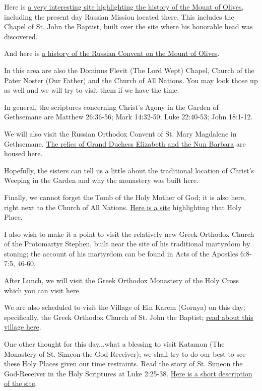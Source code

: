 \documentclass[letterpaper]{report}
\begin{document}
Here is 
\href{http://www.pravoslavie.ru/english/46854.htm}{
	a very interesting site highlighting the history of the Mount of Olives},
 including the present day Russian Mission located there.
 This includes the Chapel of St. John the Baptist,
 built over the site where his honorable head was discovered.

And here is \href{http://jerusalem-mission.org/convent_ascension.html}{
	a history of the Russian Convent on the Mount of Olives}.

In this area are also the Dominus Flevit (The Lord Wept) Chapel,
Church of the Pater Noster (Our Father) and the Church of All Nations.
You may look those up as well and we will try to visit them if we have the 
time.

In general, the scriptures concerning Christ's Agony in the Garden of 
Gethsemane are Matthew 26:36-56; Mark 14:32-50; Luke 22:40-53; John 18:1-12.

We will also visit the Russian Orthodox Convent of St. Mary Magdalene in
Gethsemane.
\href{http://www.pravoslavie.ru/english/63239.htm}{
The relics of Grand Duchess Elizabeth and the Nun Barbara} are housed here.

Hopefully, the sisters can tell us a little about the traditional location of 
Christ's Weeping in the Garden and why the monastery was built here.

Finally, we cannot forget the Tomb of the Holy Mother of God;
it is also here, right next to the Church of All Nations.
\href{https://orthodoxword.wordpress.com/2010/08/15/the-tomb-of-the-most-holy-virgin-jerusalem/}{
Here is a site} highlighting that Holy Place.

I also wish to make it a point to visit the relatively new Greek Orthodox
Church of the Protomartyr Stephen,
built near the site of his traditional martyrdom by stoning;
the account of his martyrdom can be found in
Acts of the Apostles 6:8-7:5, 46-60.

After Lunch,
we will visit the Greek Orthodox Monastery of the Holy Cross
\href{http://www.biblewalks.com/Sites/CrossMonastery.html}{
	which you can visit here}.

We are also scheduled to visit the Village of Ein Karem (Gornya)
on this day;
specifically, the Greek Orthodox Church of St. John the Baptist;
\href{https://www.holyland-pilgrimage.org/ein-karem-home-of-john-the-baptist-and-place-of-the-visitation}{read about this village here}.

One other thought for this day...what a blessing to visit Katamon
(The Monastery of St. Simeon the God-Receiver);
we shall try to do our best to see these Holy Places given our time
restraints.
Read the story of St. Simeon the God-Receiver in the Holy Scriptures at
Luke 2:25-38.
\href{http://www.goisrael.com/Tourism_Eng/Tourist%20Information/Christian%20Themes/Details/Pages/St.%20Simeon%E2%80%99s%20Monastery%20chr.aspx}
	{Here is a short description of the site}.
	
\end{document}
